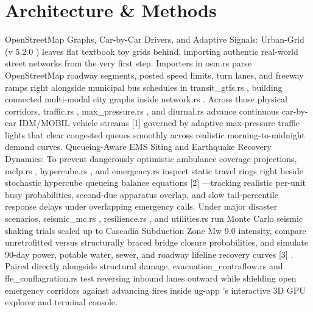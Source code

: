 \documentclass[10pt,letterpaper]{article}
\begin{document}
\section{Architecture \& Methods}
OpenStreetMap Graphs, Car-by-Car Drivers, and Adaptive Signals: Urban-Grid (v 5.2.0 ) leaves flat textbook toy grids behind, importing authentic real-world street networks from the very first step. Importers in osm.rs parse OpenStreetMap roadway segments, posted speed limits, turn lanes, and freeway ramps right alongside municipal bus schedules in transit\_gtfs.rs , building connected multi-modal city graphs inside network.rs . Across those physical corridors, traffic.rs , max\_pressure.rs , and diurnal.rs advance continuous car-by-car IDM/MOBIL vehicle streams [1] governed by adaptive max-pressure traffic lights that clear congested queues smoothly across realistic morning-to-midnight demand curves. Queueing-Aware EMS Siting and Earthquake Recovery Dynamics: To prevent dangerously optimistic ambulance coverage projections, mclp.rs , hypercube.rs , and emergency.rs inspect static travel rings right beside stochastic hypercube queueing balance equations [2] ---tracking realistic per-unit busy probabilities, second-due apparatus overlap, and slow tail-percentile response delays under overlapping emergency calls. Under major disaster scenarios, seismic\_mc.rs , resilience.rs , and utilities.rs run Monte Carlo seismic shaking trials scaled up to Cascadia Subduction Zone Mw 9.0 intensity, compare unretrofitted versus structurally braced bridge closure probabilities, and simulate 90-day power, potable water, sewer, and roadway lifeline recovery curves [3] . Paired directly alongside structural damage, evacuation\_contraflow.rs and ffe\_conflagration.rs test reversing inbound lanes outward while shielding open emergency corridors against advancing fires inside ug-app 's interactive 3D GPU explorer and terminal console.
\end{document}
